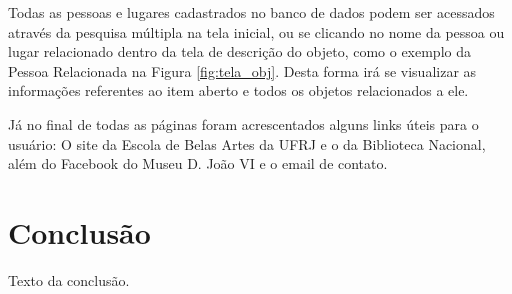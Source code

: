 \documentclass[a4paper,12pt,oneside,onecolumn,final,fleqn]{repUERJ}
\begin{document}
Todas as pessoas e lugares cadastrados no banco de dados podem ser acessados através da pesquisa múltipla na tela inicial, ou se clicando no nome da pessoa ou lugar relacionado dentro da tela de descrição do objeto, como o exemplo da Pessoa Relacionada na Figura \ref{fig:tela_obj}. Desta forma irá se visualizar as informações referentes ao item aberto e todos os objetos relacionados a ele.

Já no final de todas as páginas foram acrescentados alguns links úteis para o usuário: O site da Escola de Belas Artes da UFRJ e o da Biblioteca Nacional, além do Facebook do Museu D. João VI e o email de contato.

\chapter*{Conclusão}

Texto da conclusão.


\backmatter %






\appendix %





\end{document}
